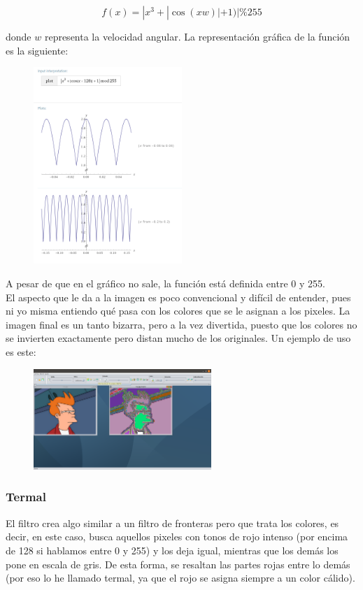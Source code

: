 \documentclass[11pt,a4paper]{article}
\begin{document}
\[f(x)=|x^3+|\cos(xw)|+1)|\%255\]

donde $w$ representa la velocidad angular. La representación gráfica de la función es la siguiente:

\begin{figure}[H]
\centering
	\includegraphics[width=0.5\textwidth]{img/plot.png}
\end{figure}

A pesar de que en el gráfico no sale, la función está definida entre 0 y 255.\\

El aspecto que le da a la imagen es poco convencional y difícil de entender, pues ni yo misma entiendo qué pasa con los colores que se le asignan a los pixeles. La imagen final es un tanto bizarra, pero a la vez divertida, puesto que los colores no se invierten exactamente pero distan mucho de los originales. Un ejemplo de uso es este:

\begin{figure}[H]
\centering
	\includegraphics[width=0.6\textwidth]{img/propia.png}
\end{figure}

\subsubsection{Termal}
El filtro crea algo similar a un filtro de fronteras pero que trata los colores, es decir, en este caso, busca aquellos pixeles con tonos de rojo intenso (por encima de 128 si hablamos entre 0 y 255) y los deja igual, mientras que los demás los pone en escala de gris. De esta forma, se resaltan las partes rojas entre lo demás (por eso lo he llamado termal, ya que el rojo se asigna siempre a un color cálido).\\
\end{document}
